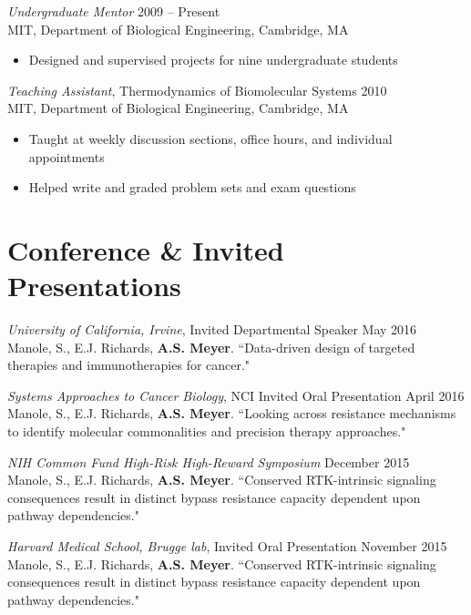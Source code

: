 \documentclass[11pt]{res}
\begin{document}
\begin{resume}
{\sl Undergraduate Mentor} \hfill 2009 -- Present \\
MIT, Department of Biological Engineering, Cambridge, MA
\begin{itemize} \itemsep -2pt %
\item Designed and supervised projects for nine undergraduate students
\end{itemize}
	

{\sl Teaching Assistant}, Thermodynamics of Biomolecular Systems \hfill 2010 \\
MIT, Department of Biological Engineering, Cambridge, MA
\begin{itemize} \itemsep -2pt %
\item Taught at weekly discussion sections, office hours, and individual appointments
\item Helped write and graded problem sets and exam questions
\end{itemize}



\clearpage
\section{Conference \& Invited Presentations}

{\sl University of California, Irvine}, Invited Departmental Speaker \hfill May 2016 \\
Manole, S., E.J. Richards, {\bf A.S. Meyer}. ``Data-driven design of targeted therapies and immunotherapies for cancer."

{\sl Systems Approaches to Cancer Biology}, NCI Invited Oral Presentation \hfill April 2016 \\
Manole, S., E.J. Richards, {\bf A.S. Meyer}. ``Looking across resistance mechanisms to identify molecular commonalities and precision therapy approaches."

{\sl NIH Common Fund High-Risk High-Reward Symposium} \hfill December 2015 \\
Manole, S., E.J. Richards, {\bf A.S. Meyer}. ``Conserved RTK-intrinsic signaling consequences result in distinct bypass resistance capacity dependent upon pathway dependencies."

{\sl Harvard Medical School, Brugge lab}, Invited Oral Presentation \hfill November 2015 \\
Manole, S., E.J. Richards, {\bf A.S. Meyer}. ``Conserved RTK-intrinsic signaling consequences result in distinct bypass resistance capacity dependent upon pathway dependencies."


\end{resume}
\end{document}
